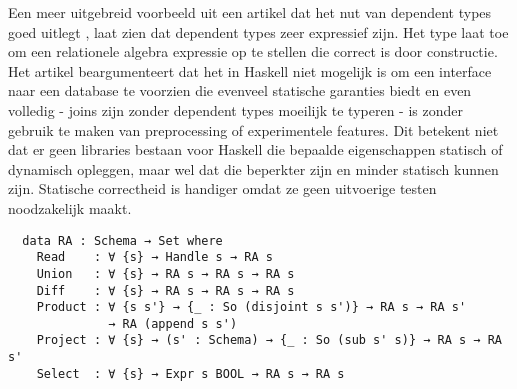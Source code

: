 Een meer uitgebreid voorbeeld uit een artikel dat het nut van dependent types
goed uitlegt \cite{TPoP}, laat zien dat dependent types zeer expressief zijn.
Het type  laat toe om een relationele algebra expressie op te stellen
die correct is door constructie. Het artikel beargumenteert dat het in Haskell
niet mogelijk is om een interface naar een database te voorzien die evenveel
statische garanties biedt en even volledig - joins zijn zonder dependent types
moeilijk te typeren - is zonder gebruik te maken van preprocessing of
experimentele features. Dit betekent niet dat er geen libraries bestaan voor
Haskell die bepaalde eigenschappen statisch of dynamisch opleggen, maar wel
dat die beperkter zijn en minder statisch kunnen zijn. Statische correctheid is
handiger omdat ze geen uitvoerige testen noodzakelijk maakt.

\begin{verbatim}
  data RA : Schema → Set where
    Read    : ∀ {s} → Handle s → RA s
    Union   : ∀ {s} → RA s → RA s → RA s
    Diff    : ∀ {s} → RA s → RA s → RA s
    Product : ∀ {s s'} → {_ : So (disjoint s s')} → RA s → RA s'
              → RA (append s s')
    Project : ∀ {s} → (s' : Schema) → {_ : So (sub s' s)} → RA s → RA s'
    Select  : ∀ {s} → Expr s BOOL → RA s → RA s
\end{verbatim}

